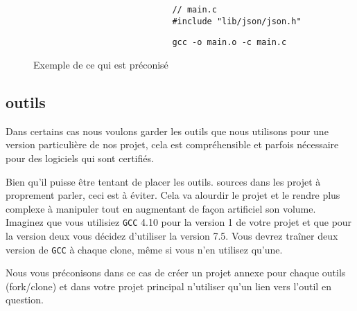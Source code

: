 			\begin{figure}[H]
				\begin{changemargin}{-2.5cm}{-2.5cm}
					\begin{tcolorbox}
						\begin{verbatim}
							// main.c
							#include "lib/json/json.h"
						\end{verbatim}
					\end{tcolorbox}
					\begin{tcolorbox}
						\begin{verbatim}
							gcc -o main.o -c main.c
						\end{verbatim}
					\end{tcolorbox}
				\end{changemargin}
				\caption{Exemple de ce qui est préconisé}
			\end{figure}

	\subsection{outils}
		Dans certains cas nous voulons garder les outils que nous utilisons pour une version particulière de nos projet, cela est compréhensible et parfois nécessaire pour des logiciels qui sont certifiés.

		Bien qu'il puisse être tentant de placer les outils. sources dans les projet à proprement parler, ceci est à éviter. Cela va alourdir le projet et le rendre plus complexe à manipuler tout en augmentant de façon artificiel son volume. Imaginez que vous utilisiez \verb+GCC+ 4.10 pour la version 1 de votre projet et que pour la version deux vous décidez d'utiliser la version 7.5. Vous devrez traîner deux version de \verb+GCC+ à chaque clone, même si vous n'en utilisez qu'une.

		Nous vous préconisons dans ce cas de créer un projet annexe pour chaque outils (fork/clone) et dans votre projet principal n'utiliser qu'un lien vers 
		l’outil en question.
